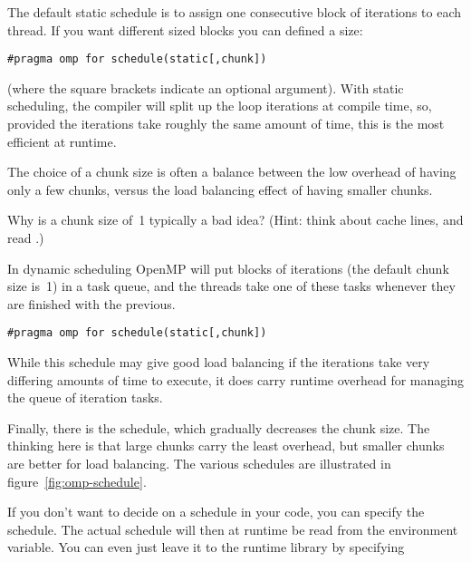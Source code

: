 The default static schedule is to assign one consecutive block of iterations
to each thread. If you want different sized blocks you can defined a  size:
\begin{verbatim}
#pragma omp for schedule(static[,chunk])
\end{verbatim}
(where the square brackets indicate an optional argument).
With static scheduling, the compiler will split up the loop iterations at compile time,
so, provided the iterations take roughly the same amount of time, this is the most efficient at runtime.

The choice of a chunk size is often a balance between the low overhead of having 
only a few chunks, versus the load balancing effect of having smaller chunks.
\begin{exercise}
  Why is a chunk size of~1 typically a bad idea? (Hint: think about
  cache lines, and read .)
\end{exercise}

In dynamic scheduling OpenMP will put blocks of iterations
(the default chunk size is~1) in a task queue, and the threads take one of these
tasks whenever they are finished with the previous.
\begin{verbatim}
#pragma omp for schedule(static[,chunk])
\end{verbatim}
While this schedule may give good load balancing if the iterations
take very differing amounts of time to execute, it does carry runtime
overhead for managing the queue of iteration tasks.

Finally, there is the  schedule, which gradually decreases the chunk size.
The thinking here is that large chunks carry the least overhead, but smaller chunks are better
for load balancing.
%
The various schedules are illustrated in figure~\ref{fig:omp-schedule}.

If you don't want to decide on a schedule in your code, you can
specify the  schedule. The actual
schedule will then at runtime be read from the
 environment variable. You can even just
leave it to the runtime library by specifying

